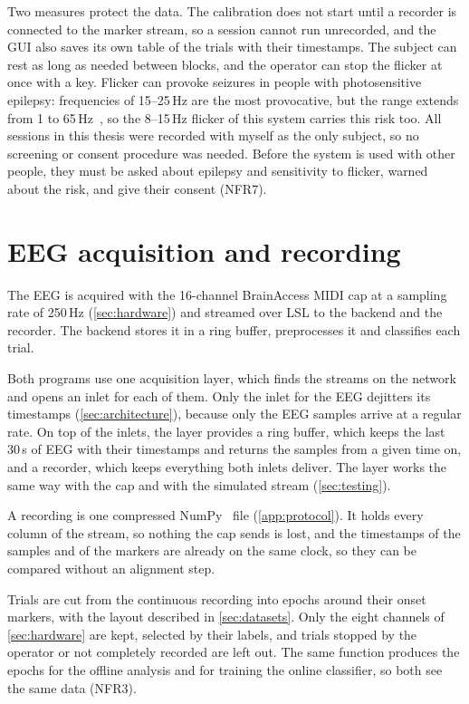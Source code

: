 Two measures protect the data. The calibration does not start until a recorder is
connected to the marker stream, so a session cannot run unrecorded, and the \ac{GUI}
also saves its own table of the trials with their timestamps.
The subject can rest as long as needed between blocks, and the operator can stop the
flicker at once with a key.
Flicker can provoke seizures in people with photosensitive epilepsy: frequencies of
15--25\,Hz are the most provocative, but the range extends from 1 to
65\,Hz~\citep{fisher2005photic}, so the 8--15\,Hz flicker of this system carries this
risk too. All sessions in this thesis were recorded with myself as the only subject, so
no screening or consent procedure was needed. Before the system is used with other
people, they must be asked about epilepsy and sensitivity to flicker, warned about the
risk, and give their consent (NFR7).

\section{EEG acquisition and recording}
\label{sec:acquisition}

The \ac{EEG} is acquired with the 16-channel BrainAccess MIDI cap at a sampling rate of
250\,Hz (\cref{sec:hardware}) and streamed over \ac{LSL} to the backend and the
recorder. The backend stores it in a ring buffer, preprocesses it and classifies each
trial.

Both programs use one acquisition layer, which finds the streams on the network and
opens an inlet for each of them. Only the inlet for the \ac{EEG} dejitters its
timestamps (\cref{sec:architecture}), because only the \ac{EEG} samples arrive at a
regular rate. On top of the inlets, the
layer provides a ring buffer, which keeps the last 30\,s of \ac{EEG} with their
timestamps and returns the samples from a given time on, and a recorder, which keeps
everything both inlets deliver. The layer works the same way with the cap and with the
simulated stream (\cref{sec:testing}).

A recording is one compressed NumPy~\citep{harris2020numpy} file
(\cref{app:protocol}). It holds every column of the stream, so nothing the cap sends is
lost, and the timestamps of the samples and of the markers are already on the same
clock, so they can be compared without an alignment step.

Trials are cut from the continuous recording into epochs around their onset markers,
with the layout described in \cref{sec:datasets}. Only the eight channels of
\cref{sec:hardware} are kept, selected by their labels, and trials stopped by the
operator or not completely recorded are left out. The same function produces the epochs
for the offline analysis and for training the online classifier, so both see the same
data (NFR3).

